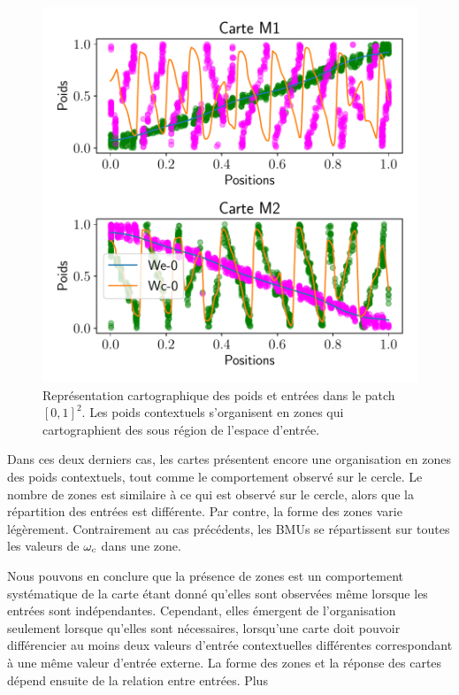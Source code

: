 \documentclass[../main]{subfiles}
\begin{document}
\begin{figure}
	\centering\includegraphics[width=\textwidth]{2som_square_w.pdf}
	\caption{Représentation cartographique des poids et entrées dans le patch $[0,1]^2$. Les poids contextuels s'organisent en zones qui cartographient des sous région de l'espace d'entrée. \label{fig:ind}}
\end{figure}

Dans ces deux derniers cas, les cartes présentent encore une organisation en zones des poids contextuels, tout comme le comportement observé sur le cercle. 
Le nombre de zones est similaire à ce qui est observé sur le cercle, alors que la répartition des entrées est différente. Par contre, la forme des zones varie légèrement.
Contrairement au cas précédents, les BMUs se répartissent sur toutes les valeurs de $\omega_c$ dans une zone.

Nous pouvons en conclure que la présence de zones est un comportement systématique de la carte étant donné qu'elles sont observées même lorsque les entrées sont indépendantes. 
Cependant, elles émergent de l'organisation seulement lorsque qu'elles sont nécessaires, lorsqu'une carte doit pouvoir différencier au moins deux valeurs d'entrée contextuelles différentes correspondant à une même valeur d'entrée externe.
La forme des zones et la réponse des cartes dépend ensuite de la relation entre entrées. Plus
\end{document}
